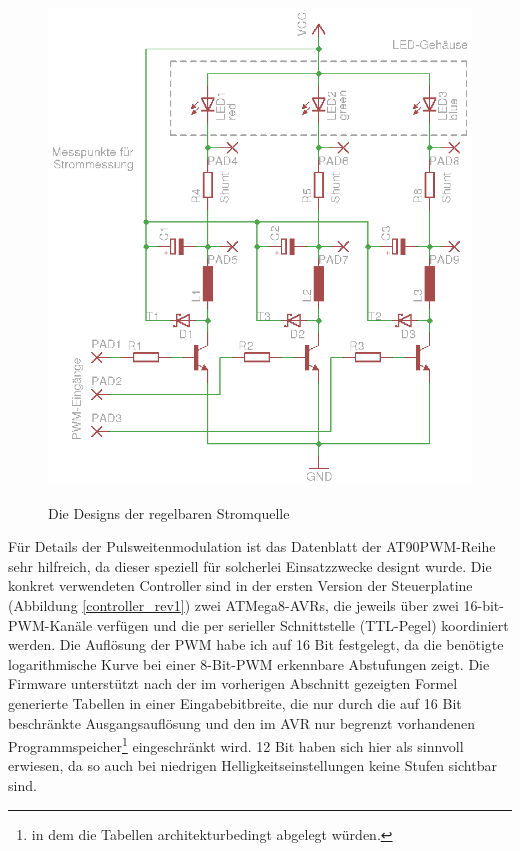 \documentclass[12pt,a4paper,notitlepage]{article}
\begin{document}
\begin{figure}
{\includegraphics[scale=1.1]{images/led_driver_rev3_02.eps}%
\label{driver_rev3}
}
\caption{Die Designs der regelbaren Stromquelle}
\label{driver_revs}
\end{figure}

Für Details der Pulsweitenmodulation ist das Datenblatt der AT90PWM-Reihe sehr hilfreich, da dieser speziell für solcherlei Einsatzzwecke designt wurde\cite{ATMEL2}. Die konkret verwendeten Controller sind in der ersten Version der Steuerplatine (Abbildung \ref{controller_rev1}) zwei ATMega8-AVRs, die jeweils über zwei 16-bit-PWM-Kanäle verfügen und die per serieller Schnittstelle (TTL-Pegel) koordiniert werden. Die Auflösung der PWM habe ich auf 16 Bit festgelegt, da die benötigte logarithmische Kurve bei einer 8-Bit-PWM erkennbare Abstufungen zeigt. Die Firmware unterstützt nach der im vorherigen Abschnitt %
gezeigten Formel generierte Tabellen in einer Eingabebitbreite, die nur durch die auf 16 Bit beschränkte Ausgangsauflösung und den im AVR nur begrenzt vorhandenen Programmspeicher\footnote{in dem die Tabellen architekturbedingt abgelegt würden.} eingeschränkt wird. 12 Bit haben sich hier als sinnvoll erwiesen, da so auch bei %
niedrigen Helligkeitseinstellungen keine Stufen sichtbar sind.
\end{document}
